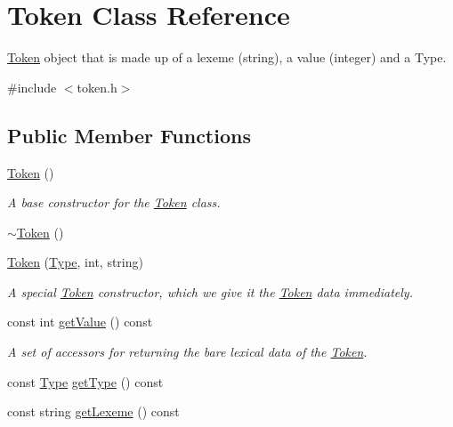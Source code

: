 \hypertarget{classToken}{
\section{Token Class Reference}
\label{classToken}
}


\hyperlink{classToken}{Token} object that is made up of a lexeme (string), a value (integer) and a Type.  




{\ttfamily \#include $<$token.h$>$}

\subsection*{Public Member Functions}
\begin{DoxyCompactItemize}
\item 
\hyperlink{classToken_aa3c5868ba4115f3189df6b2ac5b36f39}{Token} ()
\begin{DoxyCompactList}\small\item\em A base constructor for the \hyperlink{classToken}{Token} class. \item\end{DoxyCompactList}\item 
\hyperlink{classToken_a3d7d59eaac1535df1433357d5d372f84}{$\sim$Token} ()
\item 
\hyperlink{classToken_abe7d4640c0784e490bccaa254f11a8d9}{Token} (\hyperlink{token_8h_a1d1cfd8ffb84e947f82999c682b666a7}{Type}, int, string)
\begin{DoxyCompactList}\small\item\em A special \hyperlink{classToken}{Token} constructor, which we give it the \hyperlink{classToken}{Token} data immediately. \item\end{DoxyCompactList}\item 
const int \hyperlink{classToken_a9241d3f6b9174f79cdc74e824a3b8422}{getValue} () const 
\begin{DoxyCompactList}\small\item\em A set of accessors for returning the bare lexical data of the \hyperlink{classToken}{Token}. \item\end{DoxyCompactList}\item 
const \hyperlink{token_8h_a1d1cfd8ffb84e947f82999c682b666a7}{Type} \hyperlink{classToken_ab0fd5697b1b85d91ac491e687a2044f2}{getType} () const 
\item 
const string \hyperlink{classToken_af056820e37b409c87f7bb17ea8139a42}{getLexeme} () const 

\end{DoxyCompactItemize}

